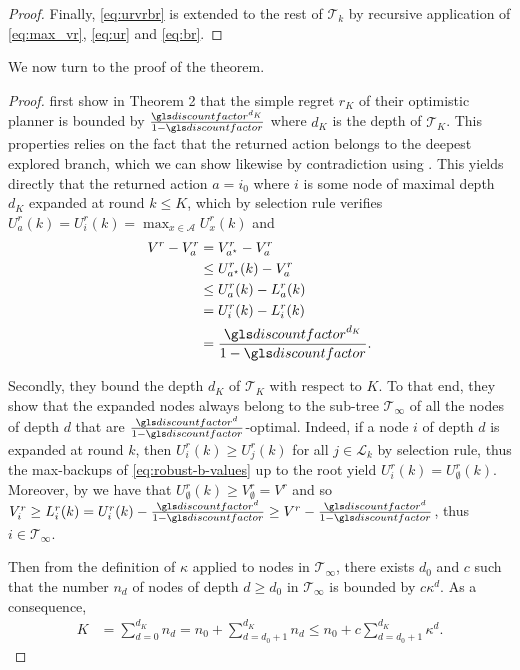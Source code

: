 \begin{subappendices}
\begin{proof}
		Finally, \eqref{eq:urvrbr} is extended to the rest of $\mathcal{T}_k$ by recursive application of \eqref{eq:max_vr}, \eqref{eq:ur} and \eqref{eq:br}.
	\end{proof}
	
	We now turn to the proof of the theorem.
	
	\begin{proof}
		\citet{Hren2008} first show in Theorem 2 that the simple regret $r_K$ of their optimistic planner is bounded by $\frac{\discount^{d_K}}{1 - \discount}$ where $d_K$ is the depth of $\mathcal{T}_K$. This properties relies on the fact that the returned action belongs to the deepest explored branch, which we can show likewise by contradiction using . This yields directly that the returned action $a = i_0$ where $i$ is some node of maximal depth $d_K$ expanded at round $k\leq K$, which by selection rule verifies $U_a^r(k) = U_i^r(k) = \max_{x\in\mathcal{A}} U_x^r(k)$ and
		\begin{align*}
		\label{eq:Rndn}
		V^r - V_a^r &= V_{a^{\star}}^r - V_a^r  \\
		&\leq U_{a^{\star}}^r(k) - V_a^r \\
		&\leq U_{a}^r(k) - L_a^r(k) \\
		&= U_{i}^r(k) - L_i^r(k) \\
		&= \frac{\discount^{d_K}}{1-\discount}.
		\end{align*}
		
		Secondly, they bound the depth $d_K$ of $\mathcal{T}_K$ with respect to $K$. To that end, they show that the expanded nodes always belong to the sub-tree $\mathcal{T}_\infty$ of all the nodes of depth $d$ that are $\frac{\discount^d}{1-\discount}$-optimal. Indeed, if a node $i$ of depth $d$ is expanded at round $k$, then $U_i^r(k) \geq U_j^r(k)$ for all $j\in \mathcal{L}_k$ by selection rule, thus the max-backups of \eqref{eq:robust-b-values} up to the root yield $U^r_i(k) = U_\emptyset^r(k)$. Moreover, by  we have that $U_\emptyset^r(k) \geq V_\emptyset^r = V^r$ and so $V_i^r \geq L_i^r(k) = U_i^r(k) - \frac{\discount^d}{1-\discount} \geq V^r - \frac{\discount^d}{1-\discount}$, thus $i \in \mathcal{T}_\infty$.
		
		Then from the definition of $\kappa$ applied to nodes in $\mathcal{T}_\infty$, there exists $d_0$ and $c$ such that the number $n_d$ of nodes of depth $d \geq d_0$ in $\mathcal{T}_\infty$ is bounded by $c\kappa^d$. As a consequence, 
		\begin{eqnarray*}
			K &= \sum_{d=0}^{d_K} n_d = n_0 + \sum_{d=d_0+1}^{d_K} n_d \leq n_0 + c\sum_{d={d_0+1}}^{d_K} \kappa^d.
		\end{eqnarray*}
		

\end{proof}
\end{subappendices}
